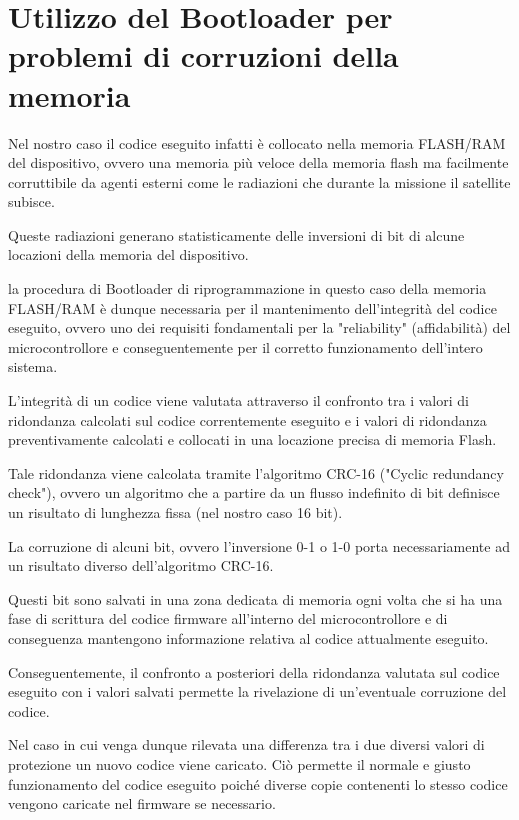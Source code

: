 \documentclass[LaM,binding=0.6cm,oneside]{../sapthesis}
\begin{document}
\section{Utilizzo del Bootloader per problemi di corruzioni della memoria}

Nel nostro caso il codice eseguito infatti è collocato nella memoria FLASH/RAM del dispositivo, ovvero una memoria più veloce della memoria flash ma facilmente corruttibile da agenti esterni come le radiazioni che durante la missione il satellite subisce.\newline

Queste radiazioni generano statisticamente delle inversioni di bit di alcune locazioni della memoria del dispositivo.

la procedura di Bootloader di riprogrammazione in questo caso della memoria FLASH/RAM è dunque necessaria per il mantenimento dell'integrità del codice eseguito, ovvero uno dei requisiti fondamentali per la "reliability" (affidabilità) del microcontrollore e conseguentemente per il corretto funzionamento dell'intero sistema.\newline

L'integrità di un codice viene valutata attraverso il confronto tra i valori di ridondanza calcolati sul codice correntemente eseguito e i valori di ridondanza preventivamente calcolati e collocati in una locazione precisa di memoria Flash.


Tale ridondanza viene calcolata tramite l'algoritmo CRC-16 ("Cyclic redundancy check"), ovvero un algoritmo che a partire da un flusso indefinito di bit definisce un risultato di lunghezza fissa (nel nostro caso 16 bit).\newline

La corruzione di alcuni bit, ovvero l'inversione 0-1 o 1-0 porta necessariamente ad un risultato diverso dell'algoritmo CRC-16.

Questi bit sono salvati in una zona dedicata di memoria ogni volta che si ha una fase di scrittura del codice firmware all’interno del microcontrollore e di conseguenza mantengono informazione relativa al codice attualmente eseguito.\newline

Conseguentemente, il confronto a posteriori della ridondanza valutata sul codice eseguito con i valori salvati permette la rivelazione di un’eventuale corruzione del codice.

Nel caso in cui venga dunque rilevata una differenza tra i due diversi valori di protezione un nuovo codice viene caricato. Ciò permette il normale e giusto funzionamento del codice eseguito poiché diverse copie contenenti lo stesso codice vengono caricate nel firmware se necessario.
\end{document}
